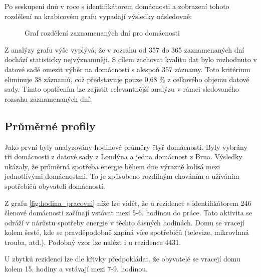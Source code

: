 \documentclass[FM,BP,fonts]{tulthesis}
\begin{document}
Po seskupení dnů v roce s identifikátorem domácnosti a zobrazení tohoto rozdělení na krabicovém grafu vypadají výsledky následovně:

\begin{figure}[htbp]
	\centering
	\caption{Graf rozdělení zaznamenaných dní pro domácnosti }
	\label{fig:domacnosti-v-case-pocet-dni}
\end{figure}


Z analýzy grafu výše vyplývá, že v rozsahu od 357 do 365 zaznamenaných dní dochází statisticky nejvýznamněji. S cílem zachovat kvalitu dat bylo rozhodnuto v datové sadě omezit výběr na domácnosti s alespoň 357 záznamy. Toto kritérium eliminuje 38 záznamů, což představuje pouze 0,68 \% z celkového objemu datové sady. Tímto opatřením lze zajistit relevantnější analýzu v rámci sledovaného rozsahu zaznamenaných dní.


\newpage

\subsection{Průměrné profily}
Jako první byly analyzovány hodinové průměry čtyř domácností. Byly vybrány tři domácnosti z datové sady z Londýna a jedna domácnost z Brna. Výsledky ukázaly, že průměrná spotřeba energie během dne výrazně kolísá mezi jednotlivými domácnostmi. To je způsobeno rozdílným chováním a užíváním spotřebičů obyvateli domácností.

Z grafu \ref{fig:hodina_pracovni} níže lze vidět, že u rezidence s identifikátorem 246 členové domácnosti začínají vstávat mezi 5-6. hodinou do práce. Tato aktivita se odráží v nárůstu spotřeby energie v těchto časných hodinách. Domu se vracejí kolem šesté, kde se pravděpodobně zapíná více spotřebičů (televize, mikrovlnná trouba, atd.). Podobný vzor lze nalézt i u rezidence 4431.

U zbytků rezidencí lze dle křivky předpokládat, že obyvatelé se vracejí domu kolem 15. hodiny a vstávají mezi 7-9. hodinou.
 
\end{document}
